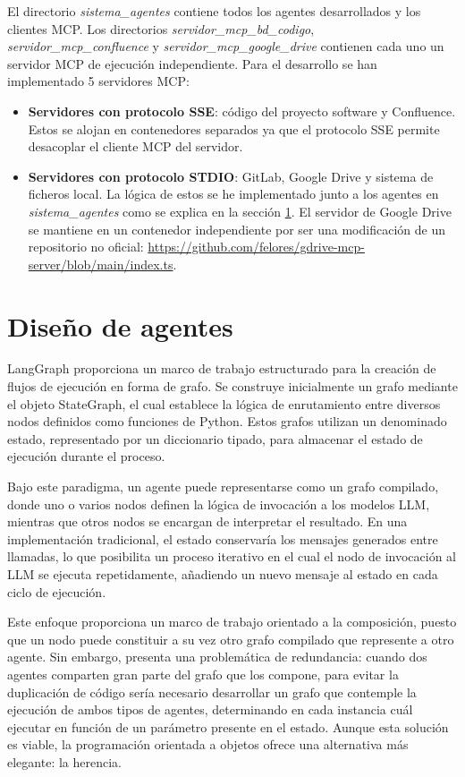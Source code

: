 El directorio \textit{sistema\_agentes} contiene todos los agentes desarrollados y los clientes MCP. Los directorios \textit{servidor\_mcp\_bd\_codigo}, \textit{servidor\_mcp\_confluence} y \textit{servidor\_mcp\_google\_drive} contienen cada uno un servidor MCP de ejecución independiente. Para el desarrollo se han implementado 5 servidores MCP:

\begin{itemize}
\item \textbf{Servidores con protocolo SSE}: código del proyecto software y Confluence. Estos se alojan en contenedores separados ya que el protocolo SSE permite desacoplar el cliente MCP del servidor.

\item \textbf{Servidores con protocolo STDIO}: GitLab, Google Drive y sistema de ficheros local. La lógica de estos se he implementado junto a los agentes en \textit{sistema\_agentes} como se explica en la sección \ref{}. El servidor de Google Drive se mantiene en un contenedor independiente por ser una modificación de un repositorio no oficial: \url{https://github.com/felores/gdrive-mcp-server/blob/main/index.ts}.
\end{itemize}

\section{Diseño de agentes}

LangGraph proporciona un marco de trabajo estructurado para la creación de flujos de ejecución en forma de grafo. Se construye inicialmente un grafo mediante el objeto StateGraph, el cual establece la lógica de enrutamiento entre diversos nodos definidos como funciones de Python. Estos grafos utilizan un denominado estado, representado por un diccionario tipado, para almacenar el estado de ejecución durante el proceso.

Bajo este paradigma, un agente puede representarse como un grafo compilado, donde uno o varios nodos definen la lógica de invocación a los modelos LLM, mientras que otros nodos se encargan de interpretar el resultado. En una implementación tradicional, el estado conservaría los mensajes generados entre llamadas, lo que posibilita un proceso iterativo en el cual el nodo de invocación al LLM se ejecuta repetidamente, añadiendo un nuevo mensaje al estado en cada ciclo de ejecución.

Este enfoque proporciona un marco de trabajo orientado a la composición, puesto que un nodo puede constituir a su vez otro grafo compilado que represente a otro agente. Sin embargo, presenta una problemática de redundancia: cuando dos agentes comparten gran parte del grafo que los compone, para evitar la duplicación de código sería necesario desarrollar un grafo que contemple la ejecución de ambos tipos de agentes, determinando en cada instancia cuál ejecutar en función de un parámetro presente en el estado. Aunque esta solución es viable, la programación orientada a objetos ofrece una alternativa más elegante: la herencia.

